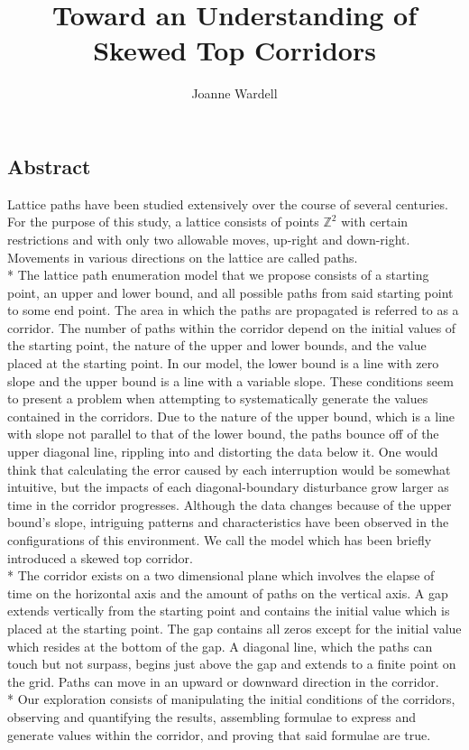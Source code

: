 \documentclass{article}
\title{Toward an Understanding of Skewed Top Corridors}
\author{Joanne Wardell}
\newcommand*{\set}[1]{\mathbb{#1}}
\newcommand\tab[1][1cm]{\hspace*{#1}}
\begin{document}
\maketitle
\subsection*{Abstract}
\tab 
Lattice paths have been studied extensively over the course of several centuries. For the purpose of this study, a lattice consists of points $\set{Z}^{2}$ with certain restrictions and with only two allowable moves, up-right and
down-right.
Movements in various directions on the lattice are called paths.
\\*
\tab The lattice path enumeration model that we propose consists of a starting point, an upper and lower bound, and all possible paths from said starting point to some end point.
The area in which the paths are propagated is referred to as a corridor. The number of paths within the corridor depend on the initial values of the starting point, the nature of the upper and lower bounds, and the value placed at the
starting point. In our model, the lower bound is a line with zero slope and the upper bound is a line with a variable slope. These conditions seem to present a problem when attempting to systematically generate the values contained 
in the corridors. Due to the nature of the upper bound, which is a line with slope not parallel to that of the lower bound, the paths bounce off of the upper diagonal line, 
rippling into and distorting the data below it. One would think that calculating the error caused by each interruption would be somewhat intuitive, but the impacts of each diagonal-boundary disturbance grow larger as
time in the corridor progresses. Although the data changes because of the upper bound's slope, intriguing patterns and characteristics have been observed in the configurations of this environment. 
We call the model
which has been briefly introduced a skewed top corridor. \\*
\tab The corridor exists on a two dimensional plane which involves the elapse of time on the horizontal axis and the amount of paths on the vertical axis. A gap extends vertically from the starting point and contains the 
initial value which is placed at the starting point. The gap contains all zeros except for the initial value which resides at the bottom of the gap. A diagonal line, which the paths can touch but 
not surpass, begins just above the gap and extends to a finite point on the grid. Paths can move in an upward or downward direction in the corridor.\\*
\tab Our exploration consists of manipulating the initial conditions of the corridors, observing and quantifying the results, assembling formulae to express and generate 
values within the corridor, and proving that said formulae are true. 
\end{document}
